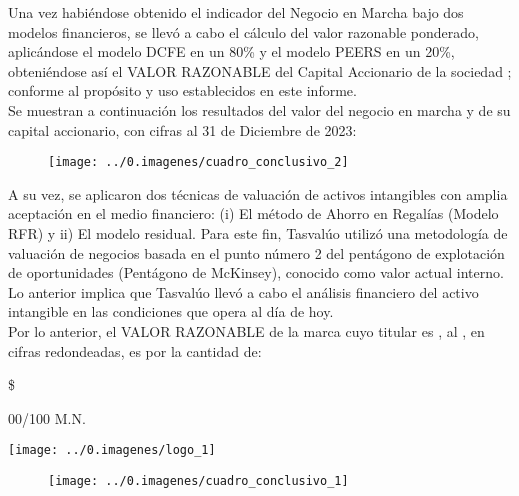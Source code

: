 Una vez habiéndose obtenido el indicador del Negocio en Marcha bajo dos modelos financieros, se llevó a cabo el cálculo del \textcolor{principal}{valor razonable ponderado}, aplicándose el \textcolor{principal}{modelo DCFE} en un \textcolor{principal}{80\%} y el modelo PEERS en un \textcolor{principal}{20\%}, obteniéndose así el \textcolor{principal}{VALOR RAZONABLE del Capital Accionario de la sociedad \empresaSolicitante}; conforme al propósito y uso establecidos en este informe.\\

Se muestran a continuación los resultados del valor del negocio en marcha y de su capital accionario, con cifras al 31 de Diciembre de 2023:

\begin{figure}[H]
\centering
\texttt{[image: ../0.imagenes/cuadro\_conclusivo\_2]}
\end{figure}

A su vez, se aplicaron dos técnicas de valuación de activos intangibles con amplia aceptación en el medio financiero: \textcolor{principal}{(i) El método de Ahorro en Regalías (Modelo RFR)} y \textcolor{principal}{ii) El modelo residual}. Para este fin, \textcolor{principal}{Tasvalúo} utilizó una metodología de valuación de negocios basada en el punto número 2 del pentágono de explotación de oportunidades (Pentágono de McKinsey), conocido como valor actual interno. Lo anterior  implica que \textcolor{principal}{Tasvalúo} llevó a  cabo el análisis financiero del activo intangible en las condiciones que opera al día de hoy.\\

Por lo anterior, el \textcolor{principal}{VALOR RAZONABLE de la marca \marca} cuyo titular es \textcolor{principal}{\textbf{\empresaCorto}},  al \fechaValores, en cifras redondeadas, es por la cantidad de:\\

\begin{center}
\begin{minipage}{8cm}
\textcolor{principal}{\$\valorActivoIntangible{} \monedaCode}

\textcolor{principal}{\valorActivoIntangibleLetra{} \moneda{} 00/100 M.N.}

\end{minipage}
\quad
\begin{minipage}{4cm}
\texttt{[image: ../0.imagenes/logo\_1]}
\end{minipage}

\begin{figure}[H]
\centering
\texttt{[image: ../0.imagenes/cuadro\_conclusivo\_1]}
\end{figure}

\end{center}

